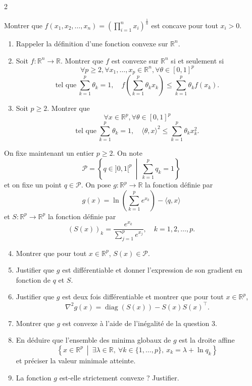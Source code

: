 \begin{multicols}{2}
\begin{exercice}
	Montrer que $f(x_{1}, x_{2}, \ldots, x_{n}) = \left( \prod_{i=1}^{n} x_{i} \right)^{\frac{1}{n}}$ est concave pour tout $x_{i} > 0$.
\end{exercice}

\begin{exercice}
	\begin{enumerate}
		\item Rappeler la définition d'une fonction convexe sur $\mathbb{R}^{n}$.
		\item Soit $f : \mathbb{R}^{n} \rightarrow \mathbb{R}$. Montrer que $f$ est convexe sur $\mathbb{R}^{n}$ si et seulement si
		\[
		\forall p \geqslant 2, \forall x_{1}, \ldots, x_{p} \in \mathbb{R}^{n}, \forall \theta \in [0,1]^{p}
		\]
		\[
		\text{tel que} \ \sum_{k=1}^{p} \theta_{k} = 1, \quad f\left( \sum_{k=1}^{p} \theta_{k} x_{k} \right) \leqslant \sum_{k=1}^{p} \theta_{k} f(x_{k}).
		\]
		\item Soit $p \geqslant 2$. Montrer que
		\[
		\forall x \in \mathbb{R}^{p}, \forall \theta \in [0,1]^{p}
		\]
		\[
		\text{tel que} \ \sum_{k=1}^{p} \theta_{k} = 1, \quad \langle \theta, x \rangle^{2} \leqslant \sum_{k=1}^{p} \theta_{k} x_{k}^{2}.
		\]
	\end{enumerate}

	On fixe maintenant un entier $p \geqslant 2$. On note
	\[
	\mathcal{P} = \left\{ q \in ]0,1[^{p} \ \middle| \ \sum_{k=1}^{p} q_{k} = 1 \right\}
	\]
	et on fixe un point $q \in \mathcal{P}$. On pose $g : \mathbb{R}^{p} \rightarrow \mathbb{R}$ la fonction définie par
	\[
	g(x) = \ln\left( \sum_{k=1}^{p} e^{x_{k}} \right) - \langle q, x \rangle
	\]
	et $S : \mathbb{R}^{p} \rightarrow \mathbb{R}^{p}$ la fonction définie par
	\[
	(S(x))_{k} = \frac{e^{x_{k}}}{\sum_{j=1}^{p} e^{x_{j}}}, \quad k = 1, 2, \ldots, p.
	\]

	\begin{enumerate}
		\setcounter{enumi}{3}
		\item Montrer que pour tout $x \in \mathbb{R}^{p}$, $S(x) \in \mathcal{P}$.
		\item Justifier que $g$ est différentiable et donner l'expression de son gradient en fonction de $q$ et $S$.
		\item Justifier que $g$ est deux fois différentiable et montrer que pour tout $x \in \mathbb{R}^{p}$,
		\[
		\nabla^{2} g(x) = \operatorname{diag}(S(x)) - S(x) S(x)^{\top}.
		\]
		\item Montrer que $g$ est convexe à l'aide de l'inégalité de la question 3.
		\item En déduire que l'ensemble des minima globaux de $g$ est la droite affine
		\[
		\left\{ x \in \mathbb{R}^{p} \ \middle| \ \exists \lambda \in \mathbb{R}, \ \forall k \in \{1, \ldots, p\}, \ x_{k} = \lambda + \ln q_{k} \right\}
		\]
		et préciser la valeur minimale atteinte.
		\item La fonction $g$ est-elle strictement convexe ? Justifier.
	\end{enumerate}
\end{exercice}

\end{multicols}

